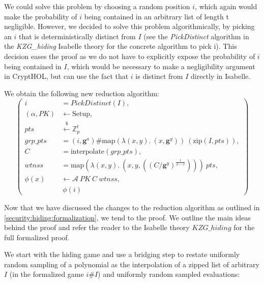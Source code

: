 We could solve this problem by choosing a random position $i$, which again would make the probability of $i$ being contained in an arbitrary list of length t negligible. However, we decided to solve this problem algorithmically, by picking an $i$ that is deterministically distinct from $I$ (see the \textit{PickDistinct} algorithm in the \textit{KZG\_hiding} Isabelle theory for the concrete algorithm to pick i). This decision eases the proof as we do not have to explicitly expose the probability of $i$ being contained in $I$, which would be necessary to make a negligibility argument in CryptHOL, but can use the fact that $i$ is distinct from $I$ directly in Isabelle.

We obtain the following new reduction algorithm: 
\begin{equation*}
    \left(
        \begin{aligned}
            i &= PickDistinct(I), \\
            (\alpha,PK) & \leftarrow \text{Setup}, \\
            pts & \overset{{\scriptscriptstyle\$}}{\leftarrow} \mathbb{Z}_p^t\\
            grp\_pts &= (i,\mathbf{g}^a)\#\text{map} (\lambda (x,y).\ (x,\mathbf{g}^y))\ (\text{zip}(I,pts)),\\
            C &= \text{interpolate}(grp\_pts),\\ 
            wtnss &= \text{map} (\lambda (x,y).\ (x,y, ((C/\mathbf{g}^y)^{\frac{1}{\alpha-x}})))\ pts,\\
            \phi(x) & \leftarrow \mathcal{A}\ PK \ C\ wtnss, \\
            & \ \phi(i)
        \end{aligned}
    \right)
\end{equation*}

Now that we have discussed the changes to the reduction algorithm as outlined in \ref{security:hiding:formalization}, we tend to the proof. We outline the main ideas behind the proof and refer the reader to the Isabelle theory $KZG\_hiding$ for the full formalized proof.

We start with the hiding game and use a bridging step to restate uniformly random sampling of a polynomial as the interpolation of a zipped list of arbitrary $I$ (in the formalized game $i\#I$) and uniformly random sampled evaluations: 

